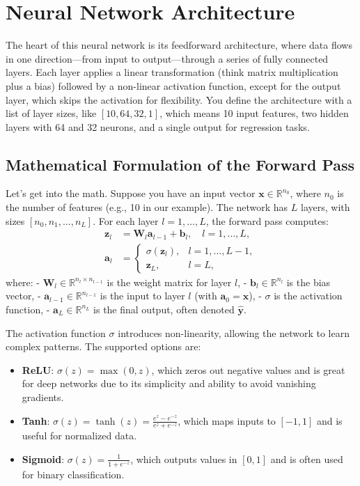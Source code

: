 \documentclass[11pt, a4paper]{article}
\begin{document}
\section{Neural Network Architecture}
The heart of this neural network is its feedforward architecture, where data flows in one direction—from input to output—through a series of fully connected layers. Each layer applies a linear transformation (think matrix multiplication plus a bias) followed by a non-linear activation function, except for the output layer, which skips the activation for flexibility. You define the architecture with a list of layer sizes, like $[10, 64, 32, 1]$, which means 10 input features, two hidden layers with 64 and 32 neurons, and a single output for regression tasks.

\subsection{Mathematical Formulation of the Forward Pass}
Let’s get into the math. Suppose you have an input vector $\mathbf{x} \in \mathbb{R}^{n_0}$, where $n_0$ is the number of features (e.g., 10 in our example). The network has $L$ layers, with sizes $[n_0, n_1, \dots, n_L]$. For each layer $l = 1, \dots, L$, the forward pass computes:
\begin{align}
    \mathbf{z}_l &= \mathbf{W}_l \mathbf{a}_{l-1} + \mathbf{b}_l, \quad l = 1, \dots, L, \label{eq:linear} \\
    \mathbf{a}_l &= \begin{cases} 
        \sigma(\mathbf{z}_l), & l = 1, \dots, L-1, \\
        \mathbf{z}_L, & l = L,
    \end{cases} \label{eq:activation}
\end{align}
where:
- $\mathbf{W}_l \in \mathbb{R}^{n_l \times n_{l-1}}$ is the weight matrix for layer $l$,
- $\mathbf{b}_l \in \mathbb{R}^{n_l}$ is the bias vector,
- $\mathbf{a}_{l-1} \in \mathbb{R}^{n_{l-1}}$ is the input to layer $l$ (with $\mathbf{a}_0 = \mathbf{x}$),
- $\sigma$ is the activation function,
- $\mathbf{a}_L \in \mathbb{R}^{n_L}$ is the final output, often denoted $\hat{\mathbf{y}}$.

The activation function $\sigma$ introduces non-linearity, allowing the network to learn complex patterns. The supported options are:
\begin{itemize}
    \item \textbf{ReLU}: $\sigma(z) = \max(0, z)$, which zeros out negative values and is great for deep networks due to its simplicity and ability to avoid vanishing gradients.
    \item \textbf{Tanh}: $\sigma(z) = \tanh(z) = \frac{e^z - e^{-z}}{e^z + e^{-z}}$, which maps inputs to $[-1, 1]$ and is useful for normalized data.
    \item \textbf{Sigmoid}: $\sigma(z) = \frac{1}{1 + e^{-z}}$, which outputs values in $[0, 1]$ and is often used for binary classification.
\end{itemize}
\end{document}
